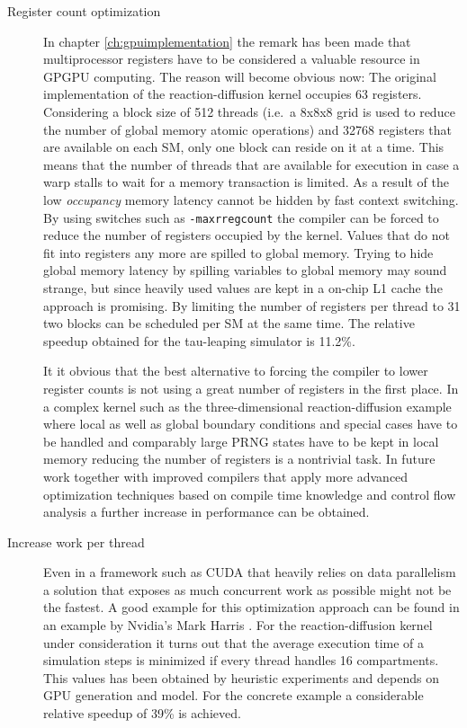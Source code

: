 \begin{description}
\item[Register count optimization] In chapter \ref{ch:gpuimplementation} the remark has been made that multiprocessor registers have to be considered a valuable resource in GPGPU computing. The reason will become obvious now: The original implementation of the reaction-diffusion kernel occupies 63 registers. Considering a block size of 512 threads (i.e.\ a 8x8x8 grid is used to reduce the number of global memory atomic operations) and 32768 registers that are available on each SM, only one block can reside on it at a time. This means that the number of threads that are available for execution in case a warp stalls to wait for a memory transaction is limited. As a result of the low \textit{occupancy} memory latency cannot be hidden by fast context switching. By using switches such as \texttt{-maxrregcount} the compiler can be forced to reduce the number of registers occupied by the kernel. Values that do not fit into registers any more are spilled to global memory. Trying to hide global memory latency by spilling variables to global memory may sound strange, but since heavily used values are kept in a on-chip L1 cache the approach is promising. By limiting the number of registers per thread to 31 two blocks can be scheduled per SM at the same time. The relative speedup obtained for the tau-leaping simulator is 11.2\%. 

It it obvious that the best alternative to forcing the compiler to lower register counts is not using a great number of registers in the first place. In a complex kernel such as the three-dimensional reaction-diffusion example where local as well as global boundary conditions and special cases have to be handled and comparably large PRNG states have to be kept in local memory reducing the number of registers is a nontrivial task. In future work together with improved compilers that apply more advanced optimization techniques based on compile time knowledge and control flow analysis a further increase in performance can be obtained. 

\item[Increase work per thread] Even in a framework such as CUDA that heavily relies on data parallelism a solution that exposes as much concurrent work as possible might not be the fastest. A good example for this optimization approach can be found in an example by Nvidia's Mark Harris \cite{nvidia reduction}. For the reaction-diffusion kernel under consideration it turns out that the average execution time of a simulation steps is minimized if every thread handles 16 compartments. This values has been obtained by heuristic experiments and depends on GPU generation and model. For the concrete example a considerable relative speedup of 39\% is achieved. 
\end{description}

